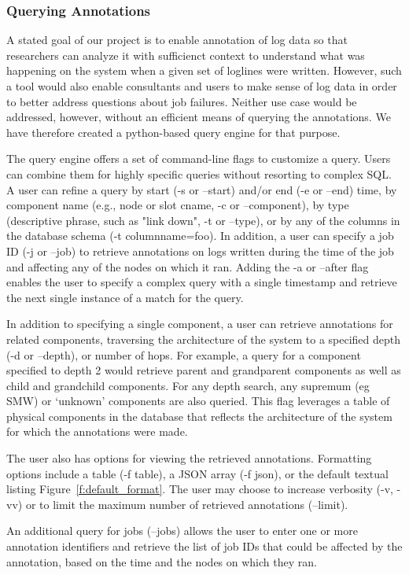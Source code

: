 \subsubsection{Querying Annotations}
\label{s:querying}
A stated goal of our project is to enable annotation of log data so that researchers can analyze it with sufficienct context to understand what was happening on the system when a given set of loglines were written. However, such a tool would also enable consultants and users to make sense of log data in order to better address questions about job failures. Neither use case would be addressed, however, without an efficient means of querying the annotations. We have therefore created a python-based query engine for that purpose.

The query engine offers a set of command-line flags to customize a query. Users can combine them for highly specific queries without resorting to complex SQL. A user can refine a query by start (-s or --start) and/or end (-e or --end) time, by component name (e.g., node or slot cname, -c or --component), by type (descriptive phrase, such as "link down", -t or --type), or by any of the columns in the database schema (-t columnname=foo). In addition, a user can specify a job ID (-j or --job) to retrieve annotations on logs written during the time of the job and affecting any of the nodes on which it ran. Adding the -a or --after flag enables the user to specify a complex query with a single timestamp and retrieve the next single instance of a match for the query.

In addition to specifying a single component, a user can retrieve annotations for related components, traversing the architecture of the system to a specified depth (-d or --depth), or number of hops. For example, a query for a component specified to depth 2 would retrieve parent and grandparent components as well as child and grandchild components. 
For any depth search, any supremum (eg SMW) or `unknown' components are also queried.
This flag leverages a table of physical components in the database that reflects the architecture of the system for which the annotations were made. 

The user also has options for viewing the retrieved annotations. Formatting options include a table (-f table), a JSON array (-f json), or the default textual listing Figure~\ref{f:default_format}. The user may choose to increase verbosity (-v, -vv) or to limit the maximum number of retrieved annotations (--limit).

An additional query for jobs (--jobs) allows the user to enter one or more annotation identifiers and retrieve the list of job IDs that could be affected by the annotation, based on the time and the nodes on which they ran.

